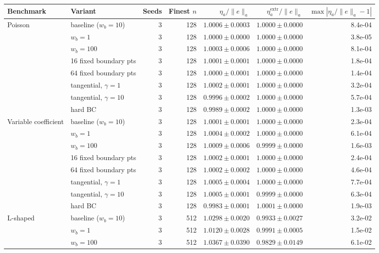 \begin{tabular}{llrrrrr}
\toprule
Benchmark & Variant & Seeds & Finest $n$ & $\eta_a/\|e\|_a$ & $\eta_a^{\mathrm{extr}}/\|e\|_a$ & $\max|\eta_a/\|e\|_a-1|$ \\
\midrule
Poisson & baseline ($w_b{=}10$) & 3 & 128 & $1.0006\pm0.0003$ & $1.0000\pm0.0000$ & 8.4e-04 \\
 & $w_b{=}1$ & 3 & 128 & $1.0000\pm0.0000$ & $1.0000\pm0.0000$ & 3.8e-05 \\
 & $w_b{=}100$ & 3 & 128 & $1.0003\pm0.0006$ & $1.0000\pm0.0000$ & 8.1e-04 \\
 & 16 fixed boundary pts & 3 & 128 & $1.0001\pm0.0001$ & $1.0000\pm0.0000$ & 1.8e-04 \\
 & 64 fixed boundary pts & 3 & 128 & $1.0000\pm0.0001$ & $1.0000\pm0.0000$ & 1.4e-04 \\
 & tangential, $\gamma{=}1$ & 3 & 128 & $1.0002\pm0.0001$ & $1.0000\pm0.0000$ & 3.2e-04 \\
 & tangential, $\gamma{=}10$ & 3 & 128 & $0.9996\pm0.0002$ & $1.0000\pm0.0000$ & 5.7e-04 \\
 & hard BC & 3 & 128 & $0.9989\pm0.0002$ & $1.0000\pm0.0000$ & 1.3e-03 \\
\midrule
Variable coefficient & baseline ($w_b{=}10$) & 3 & 128 & $1.0001\pm0.0001$ & $1.0000\pm0.0000$ & 2.3e-04 \\
 & $w_b{=}1$ & 3 & 128 & $1.0004\pm0.0002$ & $1.0000\pm0.0000$ & 6.1e-04 \\
 & $w_b{=}100$ & 3 & 128 & $1.0009\pm0.0006$ & $0.9999\pm0.0000$ & 1.6e-03 \\
 & 16 fixed boundary pts & 3 & 128 & $1.0002\pm0.0001$ & $1.0000\pm0.0000$ & 2.4e-04 \\
 & 64 fixed boundary pts & 3 & 128 & $1.0002\pm0.0002$ & $1.0000\pm0.0000$ & 4.6e-04 \\
 & tangential, $\gamma{=}1$ & 3 & 128 & $1.0005\pm0.0004$ & $1.0000\pm0.0000$ & 7.7e-04 \\
 & tangential, $\gamma{=}10$ & 3 & 128 & $1.0005\pm0.0001$ & $0.9999\pm0.0000$ & 6.3e-04 \\
 & hard BC & 3 & 128 & $0.9983\pm0.0001$ & $1.0001\pm0.0000$ & 1.9e-03 \\
\midrule
L-shaped & baseline ($w_b{=}10$) & 3 & 512 & $1.0298\pm0.0020$ & $0.9933\pm0.0027$ & 3.2e-02 \\
 & $w_b{=}1$ & 3 & 512 & $1.0120\pm0.0028$ & $0.9991\pm0.0005$ & 1.5e-02 \\
 & $w_b{=}100$ & 3 & 512 & $1.0367\pm0.0390$ & $0.9829\pm0.0149$ & 6.1e-02 \\

\end{tabular}
